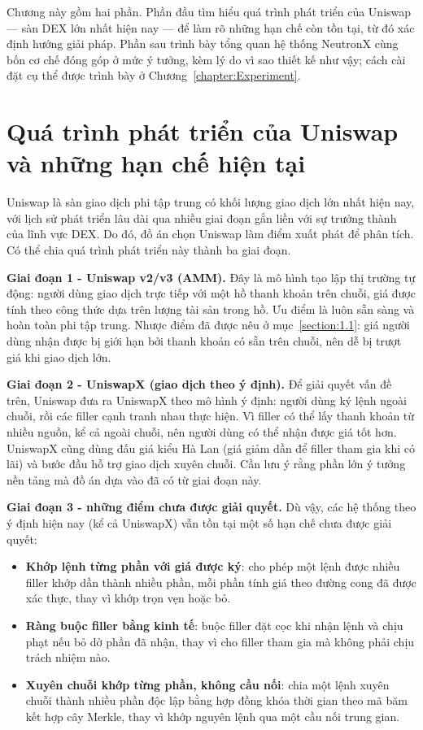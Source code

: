 \documentclass[../DoAn.tex]{subfiles}
\begin{document}
Chương này gồm hai phần. Phần đầu tìm hiểu quá trình phát triển của Uniswap --- sàn DEX lớn nhất hiện nay --- để làm rõ những hạn chế còn tồn tại, từ đó xác định hướng giải pháp. Phần sau trình bày tổng quan hệ thống NeutronX cùng bốn cơ chế đóng góp ở mức ý tưởng, kèm lý do vì sao thiết kế như vậy; cách cài đặt cụ thể được trình bày ở Chương~\ref{chapter:Experiment}.

\section{Quá trình phát triển của Uniswap và những hạn chế hiện tại}
\label{section:2.1}

Uniswap là sàn giao dịch phi tập trung có khối lượng giao dịch lớn nhất hiện nay, với lịch sử phát triển lâu dài qua nhiều giai đoạn gắn liền với sự trưởng thành của lĩnh vực DEX. Do đó, đồ án chọn Uniswap làm điểm xuất phát để phân tích. Có thể chia quá trình phát triển này thành ba giai đoạn.

\textbf{Giai đoạn 1 - Uniswap v2/v3 (AMM).} Đây là mô hình tạo lập thị trường tự động: người dùng giao dịch trực tiếp với một hồ thanh khoản trên chuỗi, giá được tính theo công thức dựa trên lượng tài sản trong hồ. Ưu điểm là luôn sẵn sàng và hoàn toàn phi tập trung. Nhược điểm đã được nêu ở mục~\ref{section:1.1}: giá người dùng nhận được bị giới hạn bởi thanh khoản có sẵn trên chuỗi, nên dễ bị trượt giá khi giao dịch lớn.

\textbf{Giai đoạn 2 - UniswapX (giao dịch theo ý định).} Để giải quyết vấn đề trên, Uniswap đưa ra UniswapX theo mô hình ý định: người dùng ký lệnh ngoài chuỗi, rồi các filler cạnh tranh nhau thực hiện. Vì filler có thể lấy thanh khoản từ nhiều nguồn, kể cả ngoài chuỗi, nên người dùng có thể nhận được giá tốt hơn. UniswapX cũng dùng đấu giá kiểu Hà Lan (giá giảm dần để filler tham gia khi có lãi) và bước đầu hỗ trợ giao dịch xuyên chuỗi. Cần lưu ý rằng phần lớn ý tưởng nền tảng mà đồ án dựa vào đã có từ giai đoạn này.

\textbf{Giai đoạn 3 - những điểm chưa được giải quyết.} Dù vậy, các hệ thống theo ý định hiện nay (kể cả UniswapX) vẫn tồn tại một số hạn chế chưa được giải quyết:
\begin{itemize}
    \item \textbf{Khớp lệnh từng phần với giá được ký}: cho phép một lệnh được nhiều filler khớp dần thành nhiều phần, mỗi phần tính giá theo đường cong đã được xác thực, thay vì khớp trọn vẹn hoặc bỏ.
    \item \textbf{Ràng buộc filler bằng kinh tế}: buộc filler đặt cọc khi nhận lệnh và chịu phạt nếu bỏ dở phần đã nhận, thay vì cho filler tham gia mà không phải chịu trách nhiệm nào.
    \item \textbf{Xuyên chuỗi khớp từng phần, không cầu nối}: chia một lệnh xuyên chuỗi thành nhiều phần độc lập bằng hợp đồng khóa thời gian theo mã băm kết hợp cây Merkle, thay vì khớp nguyên lệnh qua một cầu nối trung gian.
\end{itemize}
\end{document}
